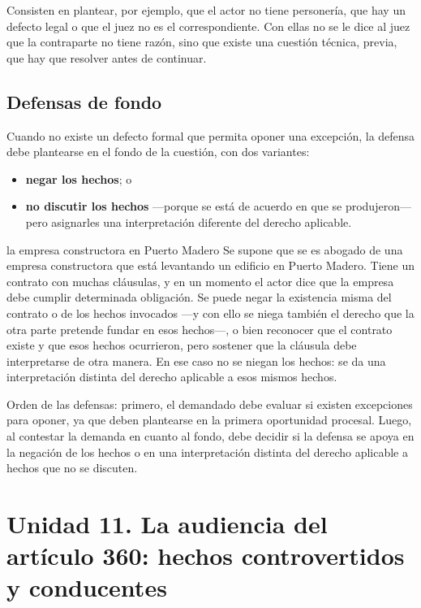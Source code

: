 \documentclass[12pt,oneside]{book}
\begin{document}
Consisten en plantear, por ejemplo, que el actor no tiene personería, que hay un defecto legal o que el juez no es el correspondiente. Con ellas no se le dice al juez que la contraparte no tiene razón, sino que existe una cuestión técnica, previa, que hay que resolver antes de continuar.

\subsection{Defensas de fondo}

Cuando no existe un defecto formal que permita oponer una excepción, la defensa debe plantearse en el fondo de la cuestión, con dos variantes:

\begin{itemize}
    \item \textbf{negar los hechos}; o
    \item \textbf{no discutir los hechos} ---porque se está de acuerdo en que se produjeron--- pero asignarles una interpretación diferente del derecho aplicable.
\end{itemize}

\begin{example}{la empresa constructora en Puerto Madero}
Se supone que se es abogado de una empresa constructora que está levantando un edificio en Puerto Madero. Tiene un contrato con muchas cláusulas, y en un momento el actor dice que la empresa debe cumplir determinada obligación. Se puede negar la existencia misma del contrato o de los hechos invocados ---y con ello se niega también el derecho que la otra parte pretende fundar en esos hechos---, o bien reconocer que el contrato existe y que esos hechos ocurrieron, pero sostener que la cláusula debe interpretarse de otra manera. En ese caso no se niegan los hechos: se da una interpretación distinta del derecho aplicable a esos mismos hechos.
\end{example}

\begin{important}
Orden de las defensas: primero, el demandado debe evaluar si existen excepciones para oponer, ya que deben plantearse en la primera oportunidad procesal. Luego, al contestar la demanda en cuanto al fondo, debe decidir si la defensa se apoya en la negación de los hechos o en una interpretación distinta del derecho aplicable a hechos que no se discuten.
\end{important}

\section{Unidad 11. La audiencia del artículo 360: hechos controvertidos y conducentes}
\end{document}
